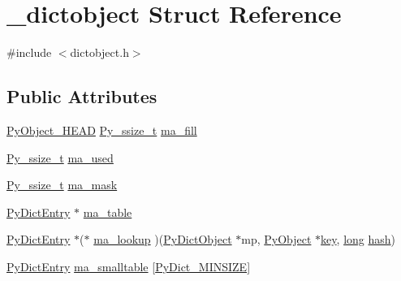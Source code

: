 \hypertarget{struct__dictobject}{}\section{\+\_\+dictobject Struct Reference}
\label{struct__dictobject}


{\ttfamily \#include $<$dictobject.\+h$>$}

\subsection*{Public Attributes}
\begin{DoxyCompactItemize}
\item 
\mbox{\hyperlink{_python27_2object_8h_a0bf35c1f3ea13f925de94d8593db3b7e}{Py\+Object\+\_\+\+H\+E\+AD}} \mbox{\hyperlink{pyport_8h_ac6411a3dfda9ac6feb9e8d859b1184bc}{Py\+\_\+ssize\+\_\+t}} \mbox{\hyperlink{struct__dictobject_a35c4ddb1dbbe09350d08e3c861a8ef5d}{ma\+\_\+fill}}
\item 
\mbox{\hyperlink{pyport_8h_ac6411a3dfda9ac6feb9e8d859b1184bc}{Py\+\_\+ssize\+\_\+t}} \mbox{\hyperlink{struct__dictobject_a070eddaa8f3e0c0291746df1a7ae5c6a}{ma\+\_\+used}}
\item 
\mbox{\hyperlink{pyport_8h_ac6411a3dfda9ac6feb9e8d859b1184bc}{Py\+\_\+ssize\+\_\+t}} \mbox{\hyperlink{struct__dictobject_a043ec319e6e9ee42aa441ac5028123b1}{ma\+\_\+mask}}
\item 
\mbox{\hyperlink{struct_py_dict_entry}{Py\+Dict\+Entry}} $\ast$ \mbox{\hyperlink{struct__dictobject_aca559ac97f4436a37fe06cf1ec2a1ffd}{ma\+\_\+table}}
\item 
\mbox{\hyperlink{struct_py_dict_entry}{Py\+Dict\+Entry}} $\ast$($\ast$ \mbox{\hyperlink{struct__dictobject_af09459ee2b142a27ccd41b0dafab43a9}{ma\+\_\+lookup}} )(\mbox{\hyperlink{dictobject_8h_aeac76c4875acec7df78dd5be7097eb61}{Py\+Dict\+Object}} $\ast$mp, \mbox{\hyperlink{_python27_2object_8h_aadc84ac7aed2cfa6f20c25f62bf3dac7}{Py\+Object}} $\ast$\mbox{\hyperlink{setobject_8h_ab06f52e01abcbec81a27c56570d3c10b}{key}}, \mbox{\hyperlink{modsupport_8h_a0cb68e00fb9fb1260ee2daadd9fe6611}{long}} \mbox{\hyperlink{group__python__builtins_ga117a7eab72791313448c40a2f25f3582}{hash}})
\item 
\mbox{\hyperlink{struct_py_dict_entry}{Py\+Dict\+Entry}} \mbox{\hyperlink{struct__dictobject_abc4c0213e2b6c67fc654cebe6b9ab686}{ma\+\_\+smalltable}} \mbox{[}\mbox{\hyperlink{dictobject_8h_ad0903eadb039a5ea8dc7654f85d752c5}{Py\+Dict\+\_\+\+M\+I\+N\+S\+I\+ZE}}\mbox{]}
\end{DoxyCompactItemize}


